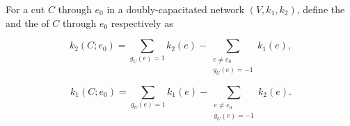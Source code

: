 For a cut $C$ through $e_0$ in a doubly-capacitated network $(V, k_1, k_2)$, define the  and the  of $C$ through $e_0$ respectively as

$$k_2(C; e_0) = \sum_{g_U(e)=1} k_2(e) - \sum_{\substack{e \neq e_0 \\ g_U(e)=-1}} k_1(e),$$

$$k_1(C; e_0) = \sum_{g_U(e)=1} k_1(e) - \sum_{\substack{e \neq e_0 \\ g_U(e)=-1}} k_2(e).$$

